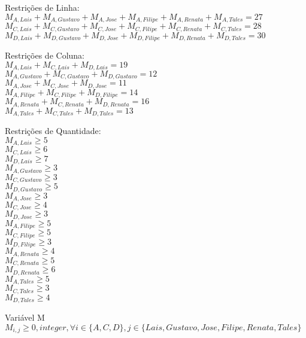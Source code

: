 \documentclass{article}
\begin{document}
    Restrições de Linha: \\
    $M_{A,Lais} + M_{A,Gustavo} + M_{A,Jose} + M_{A,Filipe} + M_{A,Renata} + M_{A,Tales} = 27$ \\
    $M_{C,Lais} + M_{C,Gustavo} + M_{C,Jose} + M_{C,Filipe} + M_{C,Renata} + M_{C,Tales} = 28$ \\
    $M_{D,Lais} + M_{D,Gustavo} + M_{D,Jose} + M_{D,Filipe} + M_{D,Renata} + M_{D,Tales} = 30$
    \vspace{5mm}

    Restrições de Coluna: \\
    $M_{A,Lais} + M_{C,Lais} + M_{D,Lais} = 19$ \\
    $M_{A,Gustavo} + M_{C,Gustavo} + M_{D,Gustavo} = 12$ \\
    $M_{A,Jose} + M_{C,Jose} + M_{D,Jose} = 11$ \\
    $M_{A,Filipe} + M_{C,Filipe} + M_{D,Filipe} = 14$ \\
    $M_{A,Renata} + M_{C,Renata} + M_{D,Renata} = 16$ \\
    $M_{A,Tales} + M_{C,Tales} + M_{D,Tales} = 13$
    \vspace{5mm}

    Restrições de Quantidade: \\
    $M_{A,Lais} \geq 5$ \\
    $M_{C,Lais} \geq 6$ \\
    $M_{D,Lais} \geq 7$ \\
    $M_{A,Gustavo} \geq 3$ \\
    $M_{C,Gustavo} \geq 3$ \\
    $M_{D,Gustavo} \geq 5$ \\
    $M_{A,Jose} \geq 3$ \\
    $M_{C,Jose} \geq 4$ \\
    $M_{D,Jose} \geq 3$ \\
    $M_{A,Filipe} \geq 5$ \\
    $M_{C,Filipe} \geq 5$ \\
    $M_{D,Filipe} \geq 3$ \\
    $M_{A,Renata} \geq 4$ \\
    $M_{C,Renata} \geq 5$ \\
    $M_{D,Renata} \geq 6$ \\
    $M_{A,Tales} \geq 5$ \\
    $M_{C,Tales} \geq 3$ \\
    $M_{D,Tales} \geq 4$
    \vspace{5mm}

    Variável M \\
    $M_{i,j} \geq 0, integer, \forall i \in \{A,C,D\}, j \in \{Lais,Gustavo,Jose,Filipe,Renata,Tales\}$ \\
\end{document}
